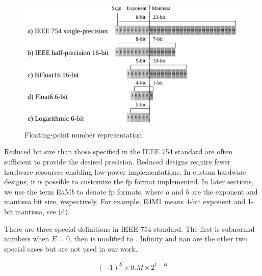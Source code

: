 \begin{figure}[b!]
	\centering
	\includegraphics[width=0.5\columnwidth]{./chapters/cnn_accelerator/figures/power_breakdown/floating_point.pdf}
	\caption{Floating-point number representation.}
	\label{fig:floating}
\end{figure}

Reduced bit size than those specified in the IEEE 754 standard are often sufficient to provide the desired precision. Reduced designs require fewer hardware resources enabling low-power implementations. In custom hardware designs, it is possible to customize the \gls{fp} format implemented. In later sections, we use the term E$a$M$b$ to denote \gls{fp} formats, where $a$ and $b$ are the exponent and mantissa bit size, respectively. For example, E4M1 means 4-bit exponent and 1-bit mantissa, see (d).

There are three special definitions in IEEE 754 standard. The first is subnormal numbers when $E=0$, then  is modified to . Infinity and \gls{nan} are the other two special cases but are not used in our work.

\begin{eqnarray} \label{eq:float_subnorm}
(-1)^{S} \times 0.M \times 2^{1-B}
\end{eqnarray}